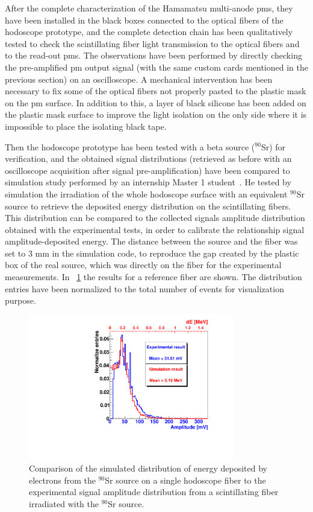 After the complete characterization of the Hamamatsu multi-anode \glspl{pm}, they have been installed in the black boxes connected to the optical fibers of the hodoscope prototype, and the complete detection chain has been qualitatively tested to check the scintillating fiber light transmission to the optical fibers and to the read-out \glspl{pm}. The observations have been performed by directly checking the pre-amplified \gls{pm} output signal (with the same custom cards mentioned in the previous section) on an oscilloscope. A mechanical intervention has been necessary to fix some of the optical fibers not properly pasted to the plastic mask on the \gls{pm} surface. In addition to this, a layer of black silicone has been added on the plastic mask surface to improve the light isolation on the only side where it is impossible to place the isolating black tape.

Then the hodoscope prototype has been tested with a beta source ($^{90}$Sr) for verification, and the obtained signal distributions (retrieved as before with an oscilloscope acquisition after signal pre-amplification) have been compared to simulation study performed by an internship Master 1 student~\parencite{Vallois2016}. He tested by simulation the irradiation of the whole hodoscope surface with an equivalent $^{90}$Sr source to retrieve the deposited energy distribution on the scintillating fibers. This distribution can be compared to the collected signals amplitude distribution obtained with the experimental tests, in order to calibrate the relationship signal amplitude-deposited energy. The distance between the source and the fiber was set to 3 mm in the simulation code, to reproduce the gap created by the plastic box of the real source, which was directly  on the fiber for the experimental measurements. In \figurename~\ref{chap3::fig::hodoSimuData} the results for a reference fiber are shown. The distribution entries have been normalized to the total number of events for visualization purpose.

\begin{figure}[htb]
\centering
\includegraphics[width=0.8\textwidth]{03_GraphicFiles/chapter3_CLaRySproto/Hodoscope/dEdistrComparison.pdf}
\caption{Comparison of the simulated distribution of energy deposited by electrons from the $^{90}$Sr source on a single hodoscope fiber to the experimental signal amplitude distribution from a scintillating fiber irradiated with the $^{90}$Sr source.}
\label{chap3::fig::hodoSimuData}
\end{figure}

